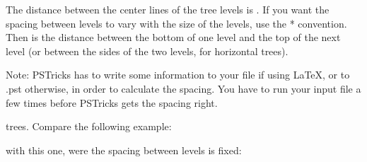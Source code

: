 \documentclass[11pt,english,BCOR10mm,DIV12,bibliography=totoc,parskip=false,smallheadings
    headexclude,footexclude,oneside]{pst-doc}
\begin{document}
The distance between the center lines of the tree levels is .
If you want the spacing between levels to vary with the size of the levels,
use the * convention. Then  is the distance between the bottom of
one level and the top of the next level (or between the sides of the two
levels, for horizontal trees).

Note: PSTricks has to write some information to your  file if using
\LaTeX, or to .pst otherwise, in order to calculate the spacing.
You have to run your input file a few times before PSTricks gets the spacing
right.



trees. Compare the following example:

\begin{LTXexample}
\def\psedge#1#2{\ncdiagg[nodesep=3pt,angleA=180,armA=0]{#2}{#1}}
\end{LTXexample}

with this one, were the spacing between levels is fixed:

\begin{LTXexample}
  \def\psedge#1#2{\ncdiagg[nodesep=3pt,angleA=180,armA=0]{#2}{#1}}
\end{LTXexample}


\end{document}
